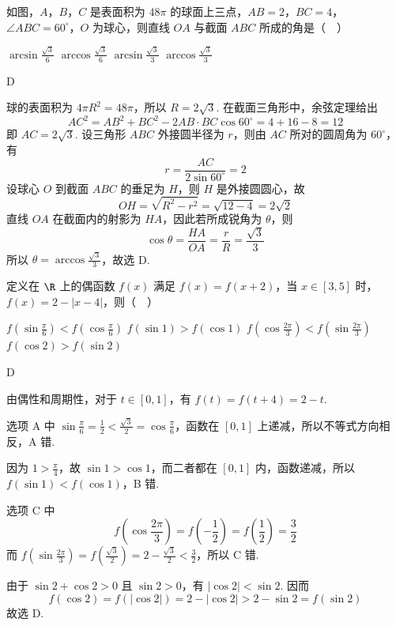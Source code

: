 \begin{problem}
如图，\(A\)，\(B\)，\(C\) 是表面积为 \(48\pi\) 的球面上三点，\(AB=2\)，\(BC=4\)，\(\angle ABC=60^{\circ}\)，\(O\) 为球心，则直线 \(OA\) 与截面 \(ABC\) 所成的角是（\(\quad\)）


\choices
    {\(\arcsin\frac{\sqrt{3}}{6}\)}
    {\(\arccos\frac{\sqrt{3}}{6}\)}
    {\(\arcsin\frac{\sqrt{3}}{3}\)}
    {\(\arccos\frac{\sqrt{3}}{3}\)}
\end{problem}

\begin{answer}D\end{answer}

\begin{solution}
球的表面积为 \(4\pi R^2=48\pi\)，所以 \(R=2\sqrt3\).  在截面三角形中，余弦定理给出
\[
AC^2=AB^2+BC^2-2AB\cdot BC\cos60^{\circ}=4+16-8=12
\]
即 \(AC=2\sqrt3\).  设三角形 \(ABC\) 外接圆半径为 \(r\)，则由 \(AC\) 所对的圆周角为 \(60^{\circ}\)，有
\[
r=\frac{AC}{2\sin60^{\circ}}=2
\]
设球心 \(O\) 到截面 \(ABC\) 的垂足为 \(H\)，则 \(H\) 是外接圆圆心，故
\[
OH=\sqrt{R^2-r^2}=\sqrt{12-4}=2\sqrt2
\]
直线 \(OA\) 在截面内的射影为 \(HA\)，因此若所成锐角为 \(\theta\)，则
\[
\cos\theta=\frac{HA}{OA}=\frac{r}{R}=\frac{\sqrt3}{3}
\]
所以 \(\theta=\arccos\frac{\sqrt3}{3}\)，故选 D.
\end{solution}

\begin{problem}
定义在 \(\R\) 上的偶函数 \(f(x)\) 满足 \(f(x)=f(x+2)\)，当 \(x\in[3,5]\) 时，\(f(x)=2-|x-4|\)，则（\(\quad\)）

\choices
    {\(f\left(\sin\frac{\pi}{6}\right)<f\left(\cos\frac{\pi}{6}\right)\)}
    {\(f(\sin 1)>f(\cos 1)\)}
    {\(f\left(\cos\frac{2\pi}{3}\right)<f\left(\sin\frac{2\pi}{3}\right)\)}
    {\(f(\cos 2)>f(\sin 2)\)}
\end{problem}

\begin{answer}D\end{answer}

\begin{solution}
由偶性和周期性，对于 \(t\in[0,1]\)，有 \(f(t)=f(t+4)=2-t\).

选项 A 中 \(\sin\frac\pi6=\frac12<\frac{\sqrt3}{2}=\cos\frac\pi6\)，函数在 \([0,1]\) 上递减，所以不等式方向相反，A 错.

因为 \(1>\frac\pi4\)，故 \(\sin1>\cos1\)，而二者都在 \([0,1]\) 内，函数递减，所以 \(f(\sin1)<f(\cos1)\)，B 错.

选项 C 中
\[
f\left(\cos\frac{2\pi}{3}\right)=f\left(-\frac12\right)=f\left(\frac12\right)=\frac32
\]
而 \(f(\sin\frac{2\pi}{3})=f\left(\frac{\sqrt3}{2}\right)=2-\frac{\sqrt3}{2}<\frac32\)，所以 C 错.

由于 \(\sin2+\cos2>0\) 且 \(\sin2>0\)，有 \(|\cos2|<\sin2\).  因而
\[
f(\cos2)=f(|\cos2|)=2-|\cos2|>2-\sin2=f(\sin2)
\]
故选 D.
\end{solution}

